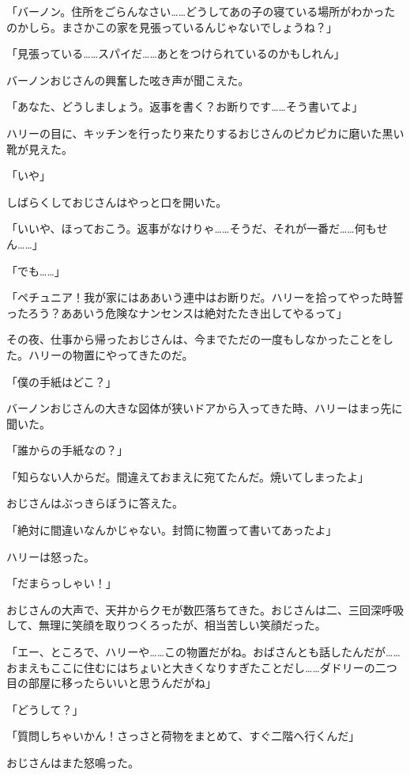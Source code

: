 \documentclass[10pt,a4paper]{article}
\begin{document}
\begin{CJK}{UTF8}{min}
「バーノン。住所をごらんなさい……どうしてあの子の寝ている場所がわかったのかしら。まさかこの家を見張っているんじゃないでしょうね？」

「見張っている……スパイだ……あとをつけられているのかもしれん」

バーノンおじさんの興奮した呟き声が聞こえた。

「あなた、どうしましょう。返事を書く？お断りです……そう書いてよ」

ハリーの目に、キッチンを行ったり来たりするおじさんのピカピカに磨いた黒い靴が見えた。

「いや」

しばらくしておじさんはやっと口を開いた。

「いいや、ほっておこう。返事がなけりゃ……そうだ、それが一番だ……何もせん……」

「でも……」

「ペチュニア！我が家にはああいう連中はお断りだ。ハリーを拾ってやった時誓ったろう？ああいう危険なナンセンスは絶対たたき出してやるって」



その夜、仕事から帰ったおじさんは、今までただの一度もしなかったことをした。ハリーの物置にやってきたのだ。

「僕の手紙はどこ？」

バーノンおじさんの大きな図体が狭いドアから入ってきた時、ハリーはまっ先に聞いた。

「誰からの手紙なの？」

「知らない人からだ。間違えておまえに宛てたんだ。焼いてしまったよ」

おじさんはぶっきらぼうに答えた。

「絶対に間違いなんかじゃない。封筒に物置って書いてあったよ」

ハリーは怒った。

「だまらっしゃい！」

おじさんの大声で、天井からクモが数匹落ちてきた。おじさんは二、三回深呼吸して、無理に笑顔を取りつくろったが、相当苦しい笑顔だった。

「エー、ところで、ハリーや……この物置だがね。おばさんとも話したんだが……おまえもここに住むにはちょいと大きくなりすぎたことだし……ダドリーの二つ目の部屋に移ったらいいと思うんだがね」

「どうして？」

「質問しちゃいかん！さっさと荷物をまとめて、すぐ二階へ行くんだ」

おじさんはまた怒鳴った。


\end{CJK}
\end{document}

